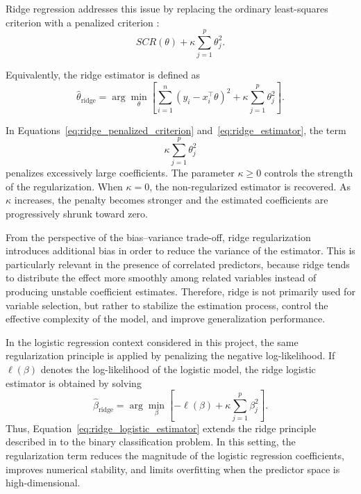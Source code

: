 Ridge regression addresses this issue by replacing the ordinary least-squares criterion with a penalized criterion \cite{keribin2025supervised}:
\begin{equation}
SCR(\theta)
+
\kappa
\sum_{j=1}^{p}
\theta_j^2 .
\label{eq:ridge_penalized_criterion}
\end{equation}

Equivalently, the ridge estimator is defined as
\begin{equation}
\widehat{\theta}_{\mathrm{ridge}}
=
\arg\min_{\theta}
\left[
\sum_{i=1}^{n}
\left(
y_i - x_i^\top \theta
\right)^2
+
\kappa
\sum_{j=1}^{p}
\theta_j^2
\right].
\label{eq:ridge_estimator}
\end{equation}

In Equations~\eqref{eq:ridge_penalized_criterion} and~\eqref{eq:ridge_estimator}, the term
\begin{equation}
\kappa
\sum_{j=1}^{p}
\theta_j^2
\label{eq:ridge_penalty}
\end{equation}
penalizes excessively large coefficients. The parameter \(\kappa \geq 0\) controls the strength of the regularization. When \(\kappa = 0\), the non-regularized estimator is recovered. As \(\kappa\) increases, the penalty becomes stronger and the estimated coefficients are progressively shrunk toward zero.

From the perspective of the bias--variance trade-off, ridge regularization introduces additional bias in order to reduce the variance of the estimator. This is particularly relevant in the presence of correlated predictors, because ridge tends to distribute the effect more smoothly among related variables instead of producing unstable coefficient estimates. Therefore, ridge is not primarily used for variable selection, but rather to stabilize the estimation process, control the effective complexity of the model, and improve generalization performance.

In the logistic regression context considered in this project, the same regularization principle is applied by penalizing the negative log-likelihood. If \(\ell(\beta)\) denotes the log-likelihood of the logistic model, the ridge logistic estimator is obtained by solving
\begin{equation}
\widehat{\beta}_{\mathrm{ridge}}
=
\arg\min_{\beta}
\left[
-\ell(\beta)
+
\kappa
\sum_{j=1}^{p}
\beta_j^2
\right].
\label{eq:ridge_logistic_estimator}
\end{equation}
Thus, Equation~\eqref{eq:ridge_logistic_estimator} extends the ridge principle described in \cite{keribin2025supervised} to the binary classification problem. In this setting, the regularization term reduces the magnitude of the logistic regression coefficients, improves numerical stability, and limits overfitting when the predictor space is high-dimensional.


